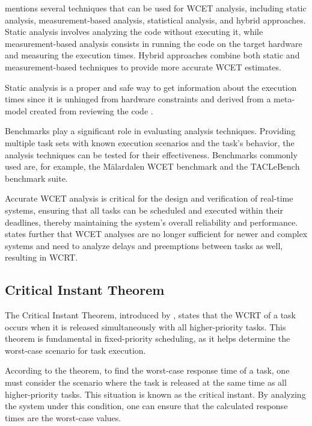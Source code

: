 \textcite{kelterWCETAnalysisOptimization} mentions several techniques that can be used for \ac{WCET} analysis, including static analysis, measurement-based analysis, statistical analysis, and hybrid approaches.
Static analysis involves analyzing the code without executing it, while measurement-based analysis consists in running the code on the target hardware and measuring the execution times.
Hybrid approaches combine both static and measurement-based techniques to provide more accurate \ac{WCET} estimates.

Static analysis is a proper and safe way to get information about the execution times since it is unhinged from hardware constraints and derived from a meta-model created from reviewing the code \cite{kelterWCETAnalysisOptimization}.

Benchmarks play a significant role in evaluating analysis techniques.
Providing multiple task sets with known execution scenarios and the task's behavior, the analysis techniques can be tested for their effectiveness. 
Benchmarks commonly used are, for example, the Mälardalen \ac{WCET} benchmark and the TACLeBench benchmark suite\cite{falkTACLeBenchBenchmarkCollection2016}.

Accurate \ac{WCET} analysis is critical for the design and verification of real-time systems, ensuring that all tasks can be scheduled and executed within their deadlines, thereby maintaining the system's overall reliability and performance\cite{kelterWCETAnalysisOptimization}.
\textcite{kelterWCETAnalysisOptimization} states further that \ac{WCET} analyses are no longer sufficient for newer and complex systems and need to analyze delays and preemptions between tasks as well, resulting in \ac{WCRT}.

\subsection{Critical Instant Theorem}\label{sec:critical_instant_theorem}
The Critical Instant Theorem, introduced by \textcite{liuSchedulingAlgorithmsMultiprogramming1973}, states that the \ac{WCRT} of a task occurs when it is released simultaneously with all higher-priority tasks.
This theorem is fundamental in fixed-priority scheduling, as it helps determine the worst-case scenario for task execution.

According to the theorem, to find the worst-case response time of a task, one must consider the scenario where the task is released at the same time as all higher-priority tasks. 
This situation is known as the critical instant. By analyzing the system under this condition, one can ensure that the calculated response times are the worst-case values.

